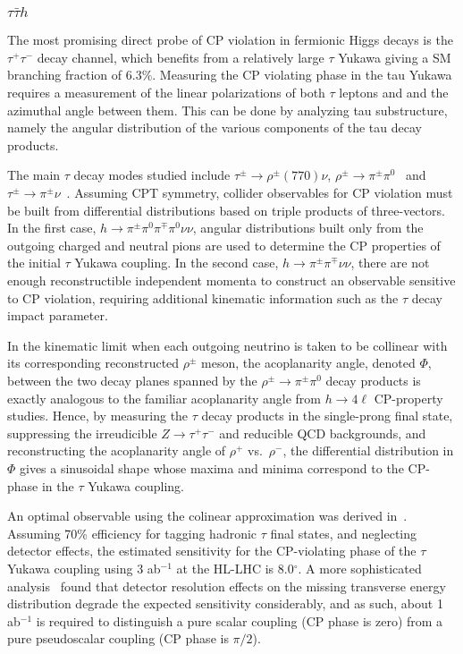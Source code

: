 \documentclass[../report.tex]{subfiles}
\begin{document}
\subsubsection{$\tau\bar{\tau} h$}

The most promising direct probe of CP violation in fermionic Higgs
decays is the $\tau^+ \tau^-$ decay channel, which benefits from a
relatively large $\tau$ Yukawa giving a SM branching fraction of
$6.3\%$. Measuring the CP violating phase in the tau Yukawa requires a measurement of the linear polarizations of both $\tau$ leptons and and the azimuthal angle between them. This can be done by analyzing tau substructure, namely the angular distribution of the various components of the tau decay products.

The main $\tau$ decay modes studied include $\tau^\pm \to
\rho^\pm (770) \nu$, $\rho^\pm \to \pi^\pm \pi^0$~\cite{Bower:2002zx,
  Desch:2003mw, Desch:2003rw, Harnik:2013aja, Askew:2015mda,
  Jozefowicz:2016kvz} and $\tau^\pm \to \pi^\pm
\nu$~\cite{Berge:2008wi, Berge:2008dr, Berge:2011ij}.  Assuming CPT
symmetry, collider observables for CP violation must be built from
differential distributions based on triple products of three-vectors.
In the first case, $h \to \pi^\pm \pi^0 \pi^\mp \pi^0 \nu \nu$,
angular distributions built only from the outgoing charged and neutral
pions are used to determine the CP properties of the initial $\tau$
Yukawa coupling.  In the second case, $h \to \pi^\pm \pi^\mp \nu \nu$,
there are not enough reconstructible independent momenta to construct an observable sensitive to CP violation, requiring additional kinematic information such as the $\tau$ decay impact parameter.

In the kinematic limit when each outgoing neutrino is taken to be
collinear with its corresponding reconstructed $\rho^\pm$ meson, the
acoplanarity angle, denoted $\Phi$, between the two decay planes
spanned by the $\rho^\pm \to \pi^\pm \pi^0$ decay products is exactly
analogous to the familiar acoplanarity angle from $h \to 4 \ell$
CP-property studies.  Hence, by measuring the $\tau$ decay products in
the single-prong final state, suppressing the irreudicible $Z \to
\tau^+ \tau^-$ and reducible QCD backgrounds, and reconstructing the
acoplanarity angle of $\rho^+$ vs.~$\rho^-$, the differential
distribution in $\Phi$ gives a sinusoidal shape whose maxima and
minima correspond to the CP-phase in the $\tau$ Yukawa coupling.  

An optimal observable using the colinear approximation was derived in~\cite{Harnik:2013aja}. Assuming 70\% efficiency for tagging hadronic $\tau$ final states, and
neglecting detector effects, the estimated sensitivity for the
CP-violating phase of the $\tau$ Yukawa coupling using 3 ab$^{-1}$ at
the HL-LHC is 8.0$^\circ$.  A more sophisticated
analysis~\cite{Askew:2015mda} found that detector resolution effects
on the missing transverse energy distribution degrade the expected
sensitivity considerably, and as such, about 1 ab$^{-1}$ is required
to distinguish a pure scalar coupling (CP phase is zero) from a pure
pseudoscalar coupling (CP phase is $\pi/2$).
\end{document}
